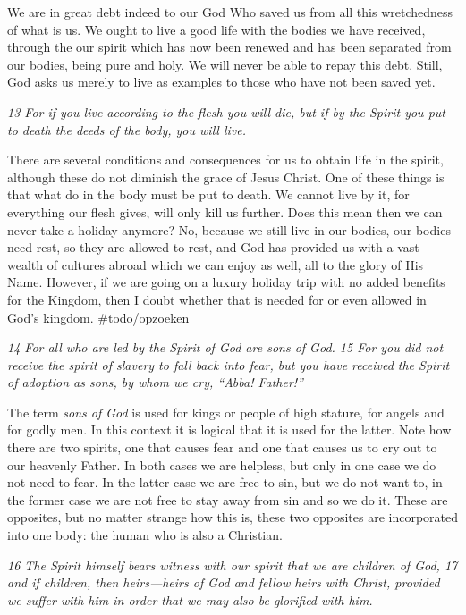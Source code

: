 We are in great debt indeed to our God Who saved us from all this
wretchedness of what is us. We ought to live a good life with the bodies
we have received, through the our spirit which has now been renewed and
has been separated from our bodies, being pure and holy. We will never
be able to repay this debt. Still, God asks us merely to live as
examples to those who have not been saved yet.

\emph{13 For if you live according to the flesh you will die, but if by
the Spirit you put to death the deeds of the body, you will live.}

There are several conditions and consequences for us to obtain life in
the spirit, although these do not diminish the grace of Jesus Christ.
One of these things is that what do in the body must be put to death. We
cannot live by it, for everything our flesh gives, will only kill us
further. Does this mean then we can never take a holiday anymore? No,
because we still live in our bodies, our bodies need rest, so they are
allowed to rest, and God has provided us with a vast wealth of cultures
abroad which we can enjoy as well, all to the glory of His Name.
However, if we are going on a luxury holiday trip with no added benefits
for the Kingdom, then I doubt whether that is needed for or even allowed
in God's kingdom. \#todo/opzoeken

\emph{14 For all who are led by the Spirit of God are sons of God. 15
For you did not receive the spirit of slavery to fall back into fear,
but you have received the Spirit of adoption as sons, by whom we cry,
``Abba! Father!''}

The term \emph{sons of God} is used for kings or people of high stature,
for angels and for godly men. In this context it is logical that it is
used for the latter. Note how there are two spirits, one that causes
fear and one that causes us to cry out to our heavenly Father. In both
cases we are helpless, but only in one case we do not need to fear. In
the latter case we are free to sin, but we do not want to, in the former
case we are not free to stay away from sin and so we do it. These are
opposites, but no matter strange how this is, these two opposites are
incorporated into one body: the human who is also a Christian.

\emph{16 The Spirit himself bears witness with our spirit that we are
children of God, 17 and if children, then heirs---heirs of God and
fellow heirs with Christ, provided we suffer with him in order that we
may also be glorified with him.}

